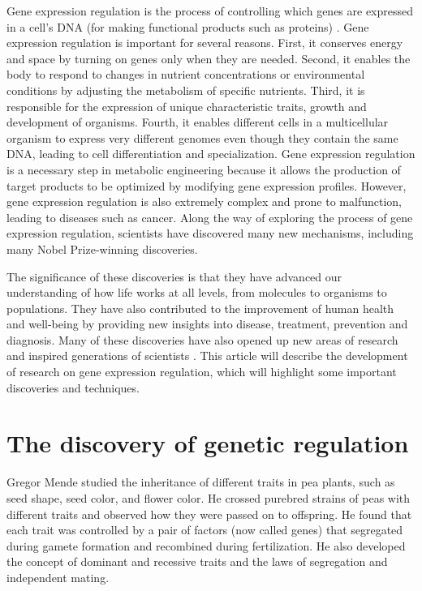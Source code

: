 \documentclass[sn-standardnature]{sn-jnl}%
\theoremstyle{thmstyleone}%
\theoremstyle{thmstyletwo}%
\theoremstyle{thmstylethree}%
\begin{document}
Gene expression regulation is the process of controlling which genes are expressed in a cell's DNA (for making functional products such as proteins) \cite{fletcher2023linking,burg1997regulation}. Gene expression regulation is important for several reasons. First, it conserves energy and space by turning on genes only when they are needed. Second, it enables the body to respond to changes in nutrient concentrations or environmental conditions by adjusting the metabolism of specific nutrients. Third, it is responsible for the expression of unique characteristic traits, growth and development of organisms. Fourth, it enables different cells in a multicellular organism to express very different genomes even though they contain the same DNA, leading to cell differentiation and specialization. Gene expression regulation is a necessary step in metabolic engineering because it allows the production of target products to be optimized by modifying gene expression profiles. However, gene expression regulation is also extremely complex and prone to malfunction, leading to diseases such as cancer. Along the way of exploring the process of gene expression regulation, scientists have discovered many new mechanisms, including many Nobel Prize-winning discoveries.

The significance of these discoveries is that they have advanced our understanding of how life works at all levels, from molecules to organisms to populations. They have also contributed to the improvement of human health and well-being by providing new insights into disease, treatment, prevention and diagnosis. Many of these discoveries have also opened up new areas of research and inspired generations of scientists \cite{burg1997regulation}.
This article will describe the development of research on gene expression regulation, which will highlight some important discoveries and techniques.



\section*{The discovery of genetic regulation}\label{sec2}

Gregor Mende studied the inheritance of different traits in pea plants, such as seed shape, seed color, and flower color. He crossed purebred strains of peas with different traits and observed how they were passed on to offspring. He found that each trait was controlled by a pair of factors (now called genes) that segregated during gamete formation and recombined during fertilization. He also developed the concept of dominant and recessive traits and the laws of segregation and independent mating.
\end{document}
